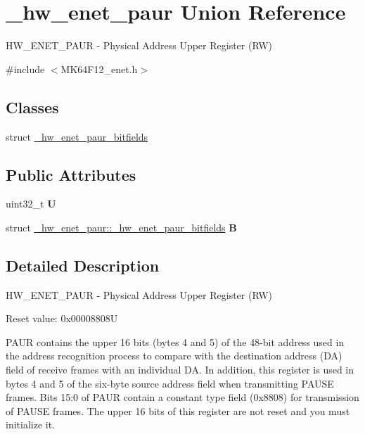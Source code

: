 \hypertarget{union__hw__enet__paur}{}\section{\+\_\+hw\+\_\+enet\+\_\+paur Union Reference}
\label{union__hw__enet__paur}


H\+W\+\_\+\+E\+N\+E\+T\+\_\+\+P\+A\+UR -\/ Physical Address Upper Register (RW)  




{\ttfamily \#include $<$M\+K64\+F12\+\_\+enet.\+h$>$}

\subsection*{Classes}
\begin{DoxyCompactItemize}
\item 
struct \hyperlink{struct__hw__enet__paur_1_1__hw__enet__paur__bitfields}{\+\_\+hw\+\_\+enet\+\_\+paur\+\_\+bitfields}
\end{DoxyCompactItemize}
\subsection*{Public Attributes}
\begin{DoxyCompactItemize}
\item 
uint32\+\_\+t {\bfseries U}\hypertarget{union__hw__enet__paur_a2d872d8a8d9a18751a7ee9f6509c8adc}{}\label{union__hw__enet__paur_a2d872d8a8d9a18751a7ee9f6509c8adc}

\item 
struct \hyperlink{struct__hw__enet__paur_1_1__hw__enet__paur__bitfields}{\+\_\+hw\+\_\+enet\+\_\+paur\+::\+\_\+hw\+\_\+enet\+\_\+paur\+\_\+bitfields} {\bfseries B}\hypertarget{union__hw__enet__paur_af25262104993b9fa84598bd63be58e89}{}\label{union__hw__enet__paur_af25262104993b9fa84598bd63be58e89}

\end{DoxyCompactItemize}


\subsection{Detailed Description}
H\+W\+\_\+\+E\+N\+E\+T\+\_\+\+P\+A\+UR -\/ Physical Address Upper Register (RW) 

Reset value\+: 0x00008808U

P\+A\+UR contains the upper 16 bits (bytes 4 and 5) of the 48-\/bit address used in the address recognition process to compare with the destination address (DA) field of receive frames with an individual DA. In addition, this register is used in bytes 4 and 5 of the six-\/byte source address field when transmitting P\+A\+U\+SE frames. Bits 15\+:0 of P\+A\+UR contain a constant type field (0x8808) for transmission of P\+A\+U\+SE frames. The upper 16 bits of this register are not reset and you must initialize it. 

